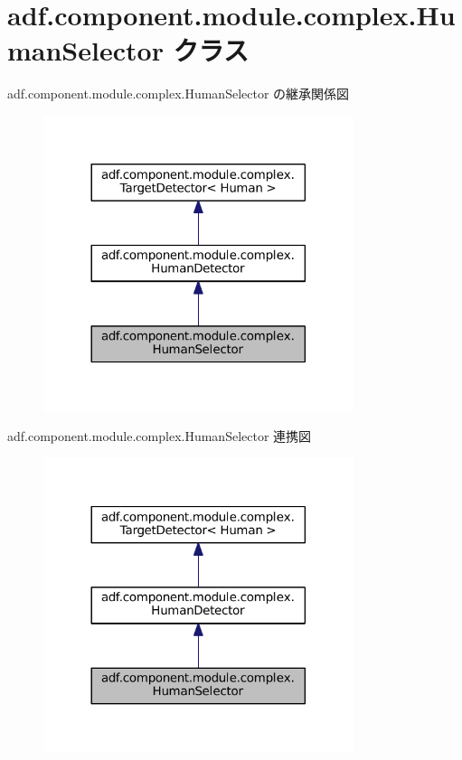 \hypertarget{classadf_1_1component_1_1module_1_1complex_1_1HumanSelector}{}\section{adf.\+component.\+module.\+complex.\+Human\+Selector クラス}
\label{classadf_1_1component_1_1module_1_1complex_1_1HumanSelector}


adf.\+component.\+module.\+complex.\+Human\+Selector の継承関係図
\nopagebreak
\begin{figure}[H]
\begin{center}
\leavevmode
\includegraphics[width=257pt]{classadf_1_1component_1_1module_1_1complex_1_1HumanSelector__inherit__graph}
\end{center}
\end{figure}


adf.\+component.\+module.\+complex.\+Human\+Selector 連携図
\nopagebreak
\begin{figure}[H]
\begin{center}
\leavevmode
\includegraphics[width=257pt]{classadf_1_1component_1_1module_1_1complex_1_1HumanSelector__coll__graph}
\end{center}
\end{figure}

